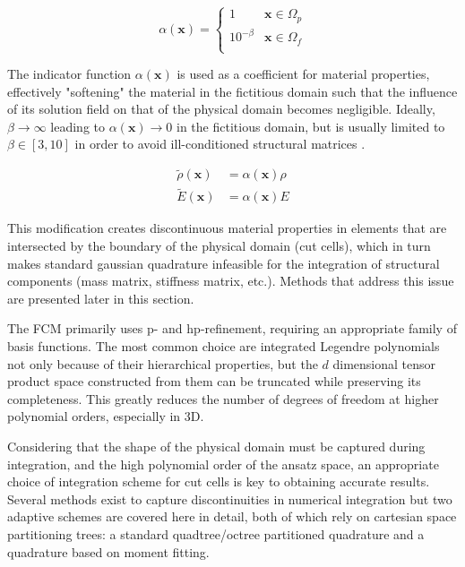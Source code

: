 \begin{equation} \label{eq:indicator_function}
	\alpha (\mathbf x) = \left\{
	\begin{array}{ll}
		1 & \mathbf x \in \Omega_p \\
		10^{-\beta} & \mathbf x \in \Omega_f \\
	\end{array}
	\right.
\end{equation}

The indicator function $\alpha(\mathbf x)$ is used as a coefficient for material properties, effectively "softening" the material in the fictitious domain such that the influence of its solution field on that of the physical domain becomes negligible.
Ideally, $\beta \to \infty$ leading to $\alpha (\mathbf x) \to 0$ in the fictitious domain, but is usually limited to $\beta \in [3,10]$ in order to avoid ill-conditioned structural matrices \cite{Parvizian2007}.

\begin{equation} \label{eq:fictitious_material_properties}
	\begin{array}{ll}
	\tilde \rho (\mathbf x) &= \alpha (\mathbf x) \rho \\
	\tilde E(\mathbf x) &= \alpha (\mathbf x) E
	\end{array}
\end{equation}

This modification creates discontinuous material properties in
elements that are intersected by the boundary of the physical domain (cut cells), which
in turn makes standard gaussian quadrature infeasible for the integration
of structural components (mass matrix, stiffness matrix, etc.). Methods that address this issue are presented later in this section.

The FCM primarily uses p- and hp-refinement, requiring an appropriate family of basis functions. The most common choice are integrated Legendre polynomials \cite{Duester2007} not only because of their hierarchical properties, but the $d$ dimensional tensor product space constructed from them can be truncated while preserving its completeness. This greatly reduces the number of degrees of freedom at higher polynomial orders, especially in 3D.

Considering that the shape of the physical domain must be captured during integration, and the high polynomial order of the ansatz space, an appropriate choice of integration scheme for cut cells is key to obtaining accurate results. Several methods exist
to capture discontinuities in numerical integration but two adaptive schemes are covered here in detail,
both of which rely on cartesian space partitioning trees: a standard quadtree/octree partitioned
quadrature and a quadrature based on moment fitting.

